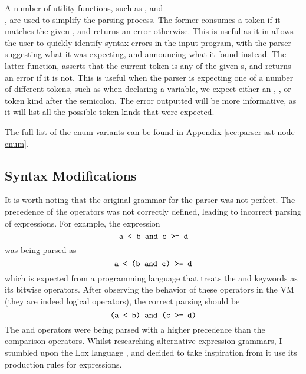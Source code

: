A number of utility functions, such as , and
\\, are used to
simplify the parsing process. The former consumes a token if it matches the
given , and returns an error otherwise. This is useful as it in
allows the user to quickly identify syntax errors in the input program, with the
parser suggesting what it was expecting, and announcing what it found instead.
The latter function, asserts that the current token is any of the given
s, and returns an error if it is not. This is useful when the
parser is expecting one of a number of different tokens, such as when declaring
a variable, we expect either an , ,  or
 token kind after the semicolon. The error outputted will be more
informative, as it will list all the possible token kinds that were expected.



The full list of the  enum variants can be found in Appendix
\ref{sec:parser-ast-node-enum}.

\subsection{Syntax Modifications}

It is worth noting that the original grammar for the parser was not perfect. The
precedence of the operators was not correctly defined, leading to incorrect
parsing of expressions.  For example, the
expression $$\texttt{a < b and c >= d}$$ was being parsed as $$\texttt{a < (b and c)
        >= d}$$ which is expected from a programming language that treats the
 and  keywords as its bitwise operators.  After
observing the behavior of these operators in the VM (they are indeed logical
operators), the correct parsing should be $$\texttt{(a < b) and (c >= d)}$$ The
 and  operators were being parsed with a higher
precedence than the comparison operators. Whilst researching alternative
expression grammars, I stumbled upon the Lox language \cite{nystrom2021crafting}, and
decided to take inspiration from it use its production rules for expressions.

